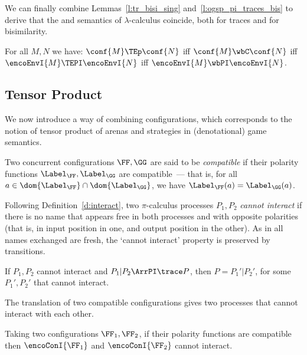 \noindent
 We can finally  combine Lemmas~\ref{l:tr_bisi_sing} and~\ref{l:ogsp_pi_traces_bis}  
 to  derive that the \COGS and \piI semantics of $\lambda$-calculus
coincide, both for traces and for bisimilarity. 

\begin{corollary}
\label{c:fa_all}
For all $M,N$ we have: 
$\conf{M} \TEp \conf {N}$ iff 
$\conf{M} \wbC \conf {N}$ iff 
$\encoEnvI {{M} } \TEPI\encoEnvI {{N}}$
iff 
$\encoEnvI {{M}} \wbPI \encoEnvI {{N}}$. 
\end{corollary} 


\subsection{Tensor Product}
\label{ss:tp}
We now introduce a way of combining configurations, which corresponds to the notion of
tensor product of arenas and strategies in (denotational) game semantics.

\begin{definition}
Two concurrent configurations $\FF,\GG$ are said to be \emph{compatible} if 
their polarity functions  $\Label_{\FF},\Label_{\GG}$ are compatible~--- that is,
for all $a \in \dom{\Label_{\FF}} \cap \dom{\Label_{\GG}}$,
we have $\Label_{\FF}(a) = \Label_{\GG}(a)$.
\end{definition}

\noindent
Following Definition~\ref{d:interact},
two $\pi$-calculus processes $P_1,P_2$ \emph{cannot interact} 
if there is no name that appears free in both processes
and with opposite polarities 
(that is, in input position in one, 
and output position in the other). 
As
 in \piI all names exchanged are fresh, 
the  `cannot interact' property is preserved by transitions.

\begin{lemma}
  \label{l:ci_trans}
If $P_1,P_2$ cannot interact and 
$P_1 | P_2 \ArrPI \trace P $, then $P =  P_1'| P_2'$, for some 
$P_1', P_2'$ that cannot interact.
\end{lemma}
 
\noindent
The \piI translation of
two compatible \COGS configurations gives two processes that 
cannot interact with each other.

\begin{lemma}
  \label{l:compat_cannot-interact}
  Taking two \COGS configurations $\FF_1,\FF_2$,
  if their polarity functions are compatible then $\encoConI {\FF_1}$ and
  $\encoConI {\FF_2}$ cannot interact.
\end{lemma} 


